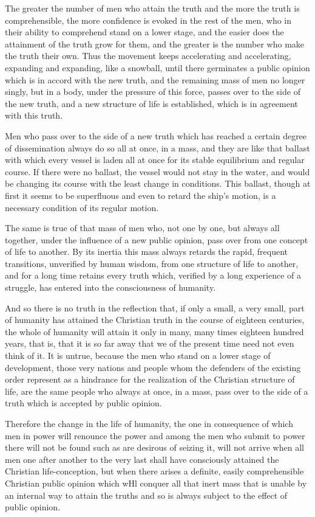 \documentclass{book}
\begin{document}
The greater the number of men who attain the truth and the more the truth is comprehensible, the more confidence is evoked in the rest of the men, who in their ability to comprehend stand on a lower stage, and the easier does the attainment of the truth grow for them, and the greater is the number who make the truth their own. Thus the movement keeps accelerating and accelerating, expanding and expanding, like a snowball, until there germinates a public opinion which is in accord with the new truth, and the remaining mass of men no longer singly, but in a body, under the pressure of this force, passes over to the side of the new truth, and a new structure of life is established, which is in agreement with this truth.

Men who pass over to the side of a new truth which has reached a certain degree of dissemination always do so all at once, in a mass, and they are like that ballast with which every vessel is laden all at once for its stable equilibrium and regular course. If there were no ballast, the vessel would not stay in the water, and would be changing its course with the least change in conditions. This ballast, though at first it seems to be superfluous and even to retard the ship’s motion, is a necessary condition of its regular motion.

The same is true of that mass of men who, not one by one, but always all together, under the influence of a new public opinion, pass over from one concept of life to another. By its inertia this mass always retards the rapid, frequent transitions, unverified by human wisdom, from one structure of life to another, and for a long time retains every truth which, verified by a long experience of a struggle, has entered into the consciousness of humanity.

And so there is no truth in the reflection that, if only a small, a very small, part of humanity has attained the Christian truth in the course of eighteen centuries, the whole of humanity will attain it only in many, many times eighteen hundred years, that is, that it is so far away that we of the present time need not even think of it. It is untrue, because the men who stand on a lower stage of development, those very nations and people whom the defenders of the existing order represent as a hindrance for the realization of the Christian structure of life, are the same people who always at once, in a mass, pass over to the side of a truth which is accepted by public opinion.

Therefore the change in the life of humanity, the one in consequence of which men in power will renounce the power and among the men who submit to power there will not be found such as are desirous of seizing it, will not arrive when all men one after another to the very last shall have consciously attained the Christian life-conception, but when there arises a definite, easily comprehensible Christian public opinion which wHl conquer all that inert mass that is unable by an internal way to attain the truths and so is always subject to the effect of public opinion.
\end{document}
